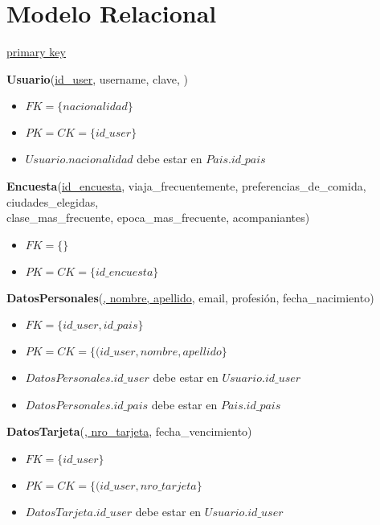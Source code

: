\section{Modelo Relacional}

\begin{framed} \centering
  \underline{primary key} \hspace*{3cm}
\end{framed}

\vspace*{0.1cm}
\noindent
\textbf{Usuario}(\underline{id\_user}, username, clave, 
    )
\begin{itemize}[noitemsep]
	\item $FK = \{nacionalidad\}$
	\item $PK = CK = \{id\_user\}$
	\item $Usuario.nacionalidad$ debe estar en $Pais.id\_pais$
\end{itemize}


\vspace*{0.1cm}
\noindent
\textbf{Encuesta}(\underline{id\_encuesta},
	viaja\_frecuentemente, preferencias\_de\_comida, ciudades\_elegidas, \\
	\hspace*{2cm} clase\_mas\_frecuente, epoca\_mas\_frecuente, acompaniantes)
\begin{itemize}[noitemsep]
	\item $FK = \{\}$
	\item $PK = CK = \{id\_encuesta\}$	
\end{itemize}

\vspace*{0.1cm}
\noindent
\textbf{DatosPersonales}(\underline{, nombre, apellido},
	email, profesión, fecha\_nacimiento)
\begin{itemize}[noitemsep]
	\item $FK = \{id\_user, id\_pais\}$
	\item $PK = CK = \{(id\_user, nombre, apellido\}$
	\item $DatosPersonales.id\_user$ debe estar en $Usuario.id\_user$
	\item $DatosPersonales.id\_pais$ debe estar en $Pais.id\_pais$
\end{itemize}

\vspace*{0.1cm}
\noindent
\textbf{DatosTarjeta}(\underline{, nro\_tarjeta}, 
    fecha\_vencimiento)
\begin{itemize}[noitemsep]
	\item $FK = \{id\_user\}$
	\item $PK = CK = \{(id\_user, nro\_tarjeta\}$
	\item $DatosTarjeta.id\_user$ debe estar en $Usuario.id\_user$
\end{itemize}


